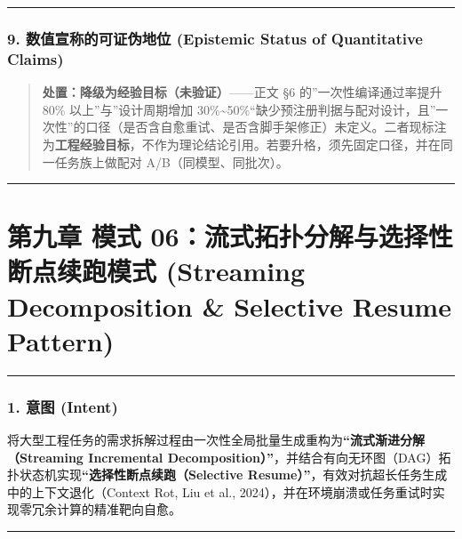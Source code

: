 \documentclass[
]{ctexart}
\renewcommand{\_}{\discretionary{}{}{\textunderscore}}
\let\oldsection\section
\renewcommand{\section}{\clearpage\oldsection}
\begin{document}
\begin{center}\rule{0.5\linewidth}{0.5pt}\end{center}

\subsubsection{9. 数值宣称的可证伪地位 (Epistemic Status of Quantitative
Claims)}\label{ux6570ux503cux5ba3ux79f0ux7684ux53efux8bc1ux4f2aux5730ux4f4d-epistemic-status-of-quantitative-claims}

\begin{quote}
\textbf{处置：降级为经验目标（未验证）}------正文 §6
的''一次性编译通过率提升 80\% 以上''与''设计周期增加
30\%\textasciitilde50\%``缺少预注册判据与配对设计，且''一次性''的口径（是否含自愈重试、是否含脚手架修正）未定义。二者现标注为\textbf{工程经验目标}，不作为理论结论引用。若要升格，须先固定口径，并在同一任务族上做配对
A/B（同模型、同批次）。
\end{quote}

\begin{center}\rule{0.5\linewidth}{0.5pt}\end{center}

\section{第九章 模式 06：流式拓扑分解与选择性断点续跑模式 (Streaming
Decomposition \& Selective Resume
Pattern)}\label{ux6a21ux5f0f-06ux6d41ux5f0fux62d3ux6251ux5206ux89e3ux4e0eux9009ux62e9ux6027ux65adux70b9ux7eedux8dd1ux6a21ux5f0f-streaming-decomposition-selective-resume-pattern}

\begin{center}\rule{0.5\linewidth}{0.5pt}\end{center}

\subsubsection{1. 意图 (Intent)}\label{ux610fux56fe-intent-5}

将大型工程任务的需求拆解过程由一次性全局批量生成重构为\textbf{``流式渐进分解（Streaming
Incremental
Decomposition）''}，并结合有向无环图（DAG）拓扑状态机实现\textbf{``选择性断点续跑（Selective
Resume）''}，有效对抗超长任务生成中的上下文退化（Context Rot, Liu et
al., 2024），并在环境崩溃或任务重试时实现零冗余计算的精准靶向自愈。

\begin{center}\rule{0.5\linewidth}{0.5pt}\end{center}
\end{document}

